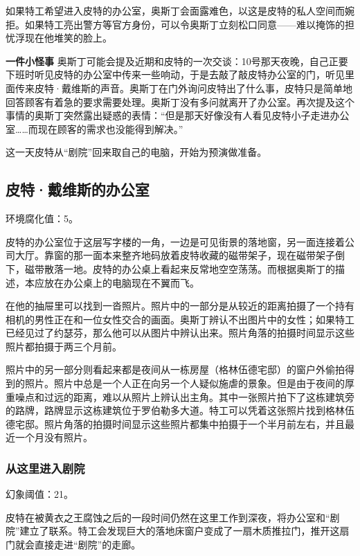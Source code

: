 如果特工希望进入皮特的办公室，奥斯丁会面露难色，以这是皮特的私人空间而婉拒。如果特工亮出警方等官方身份，可以令奥斯丁立刻松口同意——难以掩饰的担忧浮现在他堆笑的脸上。

\textbf{一件小怪事}
奥斯丁可能会提及近期和皮特的一次交谈：10号那天夜晚，自己正要下班时听见皮特的办公室中传来一些响动，于是去敲了敲皮特办公室的门，听见里面传来皮特·戴维斯的声音。奥斯丁在门外询问皮特出了什么事，皮特只是简单地回答顾客有着急的要求需要处理。奥斯丁没有多问就离开了办公室。再次提及这个事情的奥斯丁突然露出疑惑的表情：“但是那天好像没有人看见皮特小子走进办公室……而现在顾客的需求也没能得到解决。”

这一天皮特从“剧院”回来取自己的电脑，开始为预演做准备。

\subsection{皮特·戴维斯的办公室}
环境腐化值：5。

皮特的办公室位于这层写字楼的一角，一边是可见街景的落地窗，另一面连接着公司大厅。靠窗的那一面本来整齐地码放着皮特收藏的磁带架子，现在磁带架子倒下，磁带散落一地。皮特的办公桌上看起来反常地空空荡荡。而根据奥斯丁的描述，本应放在办公桌上的电脑现在不翼而飞。

在他的抽屉里可以找到一沓照片。照片中的一部分是从较近的距离拍摄了一个持有相机的男性正在和一位女性交合的画面。奥斯丁辨认不出图片中的女性；如果特工已经见过了约瑟芬，那么他可以从图片中辨认出来。照片角落的拍摄时间显示这些照片都拍摄于两三个月前。

照片中的另一部分则看起来都是夜间从一栋房屋（格林伍德宅邸）的窗户外偷拍得到的照片。照片中总是一个人正在向另一个人疑似施虐的景象。但是由于夜间的厚重噪点和过远的距离，难以从照片上辨认出主角。其中一张照片拍下了这栋建筑旁的路牌，路牌显示这栋建筑位于罗伯勒多大道。特工可以凭着这张照片找到格林伍德宅邸。照片角落的拍摄时间显示这些照片都集中拍摄于一个半月前左右，并且最近一个月没有照片。

\subsubsection{从这里进入剧院}
幻象阈值：21。

皮特在被黄衣之王腐蚀之后的一段时间仍然在这里工作到深夜，将办公室和“剧院”建立了联系。特工会发现巨大的落地床窗户变成了一扇木质推拉门，推开这扇门就会直接走进“剧院”的走廊。